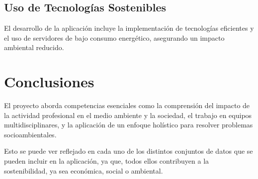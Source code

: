 \subsection{Uso de Tecnologías Sostenibles}
El desarrollo de la aplicación incluye la implementación de tecnologías eficientes y el uso de servidores de bajo consumo energético, asegurando un impacto ambiental reducido.

\section{Conclusiones}
El proyecto aborda competencias esenciales como la comprensión del impacto de la actividad profesional en el medio ambiente y la sociedad, el trabajo en equipos multidisciplinares, y la aplicación de un enfoque holístico para resolver problemas socioambientales.

Esto se puede ver reflejado en cada uno de los distintos conjuntos de datos que se pueden incluir en la aplicación, ya que, todos ellos contribuyen a la sostenibilidad, ya sea económica, social o ambiental. 

